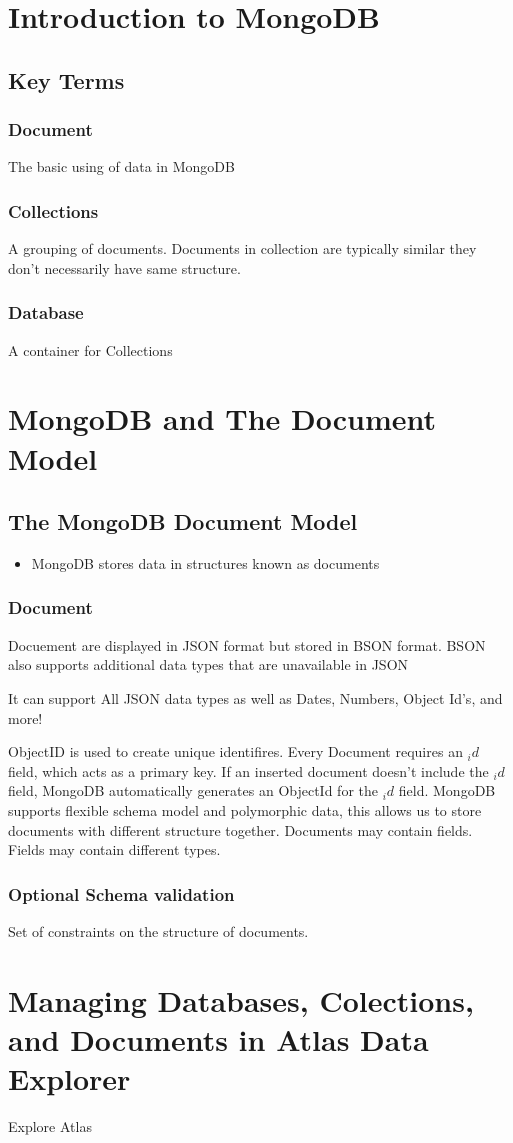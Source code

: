 \documentclass[../main.tex]{subfiles}
\begin{document}
\section{Introduction to MongoDB}
\subsection{Key Terms}
\subsubsection{Document}
The basic using of data in MongoDB
\subsubsection{Collections}
A grouping of documents. Documents in collection are typically similar they don't necessarily have same structure.
\subsubsection{Database}
A container for Collections

\section{MongoDB and The Document Model}
\subsection{The MongoDB Document Model}
\begin{itemize}
	\item{MongoDB stores data in structures known as documents}
\end{itemize}

\subsubsection{Document}
Docuement are displayed in \gls{JSON} format but stored in \gls{BSON} format.
\gls{BSON} also supports additional data types that are unavailable in \gls{JSON}

It can support All \gls{JSON} data types as well as Dates, Numbers, Object Id's, and more!
 
ObjectID is used to create unique identifires.
Every Document requires an $_id$ field, which acts as a primary key.
If an inserted document doesn't include the $_id$ field, MongoDB automatically generates an ObjectId for the $_id$ field.
MongoDB supports flexible schema model and polymorphic data, this allows us to store documents with different structure together.
Documents may contain fields. Fields may contain different types.

\subsubsection{Optional Schema validation}
Set of constraints on the structure of documents.

\section{Managing Databases, Colections, and Documents in Atlas Data Explorer}
Explore Atlas


\printglossaries
\end{document}
